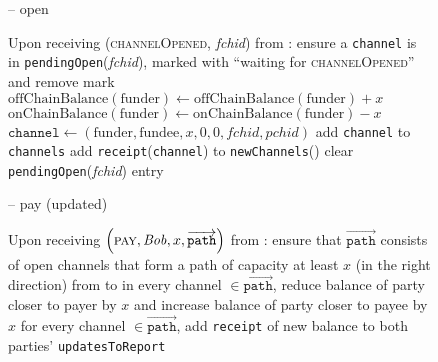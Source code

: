 \begin{figure}[H]
\begin{systembox}{\fpaynet{} -- open}
\begin{algorithmic}[1]
      \State Upon receiving (\textsc{channelOpened}, \textit{fchid}) from
      \simulator:
      \Indent
        \State ensure a \texttt{channel} is in
        \texttt{pendingOpen}(\textit{fchid}), marked with ``waiting for
        \textsc{channelOpened}'' and remove mark
        \State $\mathrm{offChainBalance}\left(\mathrm{funder}\right) \gets
        \mathrm{offChainBalance}\left(\mathrm{funder}\right) + x$
        \label{alg:fpaynet:channelOpened:offchain}
        \State $\mathrm{onChainBalance}\left(\mathrm{funder}\right) \gets
        \mathrm{onChainBalance}\left(\mathrm{funder}\right) - x$
        \label{alg:fpaynet:channelOpened:onchain}
        \State $\mathtt{channel} \gets \left(\mathrm{funder}, \mathrm{fundee},
        x, 0, 0, \mathit{fchid}, \mathit{pchid}\right)$
        \State add \texttt{channel} to \texttt{channels}
        \State add \texttt{receipt}(\texttt{channel}) to
        \texttt{newChannels}(\alice)
        \label{alg:fpaynet:channelOpened:report}
        \State clear \texttt{pendingOpen}(\textit{fchid}) entry
      \EndIndent
    \end{algorithmic}
  \end{systembox}
  \caption{}
  \label{alg:fpaynet:open}
\end{figure}


\begin{figure}[H]
  \begin{systembox}{\fpaynet{} -- pay {\color{blue} (updated)}}
    \begin{algorithmic}[1]
      \State Upon receiving $\left(\textsc{pay}, \mathit{Bob}, x,
      \overrightarrow{\mathtt{path}}\right)$ from \alice:
      \Indent
        \State ensure that $\overrightarrow{\mathtt{path}}$ consists of open
        channels that form a path of capacity at least $x$ (in the right
        direction) from \alice{} to \bob
        \State in every channel $\in \overrightarrow{\mathtt{path}}$, reduce
        balance of party closer to payer by $x$ and increase balance of party
        closer to payee by $x$
        \State for every channel $\in \overrightarrow{\mathtt{path}}$, add
        \texttt{receipt} of new balance to both parties'
        \texttt{updatesToReport}
      \EndIndent
    \end{algorithmic}
  \end{systembox}
  \caption{}
  \label{alg:fpaynet:pay}
\end{figure}

